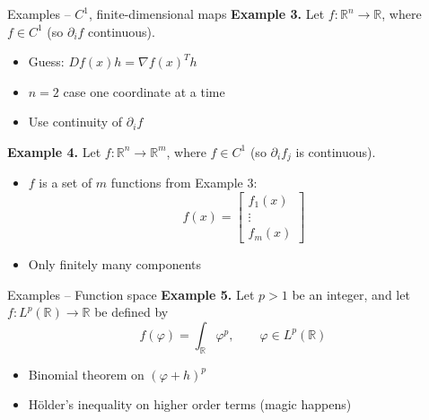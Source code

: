 \documentclass[]{beamer}
\begin{document}
	\begin{frame}{Examples -- $C^1$, finite-dimensional maps}
		\textbf{Example 3.} Let $f : \mathbb{R}^n \to \mathbb{R}$, where $f \in C^1$ (so $\partial_i f$ continuous).
		\begin{itemize}
			\item Guess: $Df(x)h = \nabla f(x)^T h$
			\item $n = 2$ case one coordinate at a time
			\item Use continuity of $\partial_i f$
		\end{itemize}
		\vfill
		
		\textbf{Example 4.} Let $f: \mathbb{R}^n \to \mathbb{R}^m$, where $f \in C^1$ (so $\partial_i f_j$ is continuous). 
		\begin{itemize}
			\item $f$ is a set of $m$ functions from Example 3:
			\begin{equation*}
				f(x) = \left[\begin{matrix}
					f_1(x) \\ \vdots \\ f_m(x)
				\end{matrix}\right]
			\end{equation*}
			\item Only finitely many components
		\end{itemize}
	\end{frame}
	
	\begin{frame}{Examples -- Function space}
		\textbf{Example 5.} Let $p > 1$ be an integer, and let $f : L^p(\mathbb{R}) \to \mathbb{R}$ be defined by
		\begin{equation*}
			f(\varphi) = \int_\mathbb{R} \varphi^p, \qquad \varphi \in L^p(\mathbb{R})
		\end{equation*}
		\begin{itemize}
			\item Binomial theorem on $(\varphi + h)^p$
			\item Hölder's inequality on higher order terms (magic happens)
		\end{itemize}
	\end{frame}
	
\end{document}
